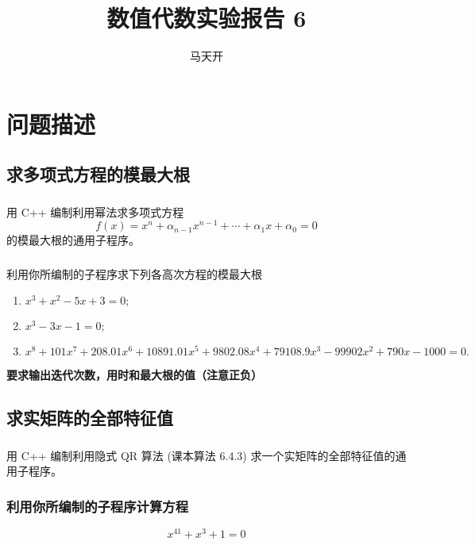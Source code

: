 \documentclass{article}
\title{数值代数实验报告 6}
\author{马天开}
\begin{document}
\maketitle

\section{问题描述}

\subsection{求多项式方程的模最大根}

\subsubsection{}用 C++ 编制利用幂法求多项式方程
\[
    f(x) = x^n + \alpha_{n-1}x^{n-1} +\cdots+ \alpha_1 x + \alpha_0 = 0
\] 的模最大根的通用子程序。

\subsubsection{}利用你所编制的子程序求下列各高次方程的模最大根

\begin{enumerate}
    \item $x^3 + x^2 - 5x + 3 = 0;$
    \item $x^3 - 3x - 1 = 0;$
    \item $x^8 + 101x^7 + 208.01x^6 + 10891.01x^5 + 9802.08x^4 + 79108.9x^3-99902x^2 + 790x-1000 = 0.$
\end{enumerate}

\textbf{要求输出迭代次数，用时和最大根的值（注意正负）}


\subsection{求实矩阵的全部特征值}

\subsubsection{}用 C++ 编制利用隐式 QR 算法 (课本算法 6.4.3) 求一个实矩阵的全部特征值的通用子程序。

\subsubsection{利用你所编制的子程序计算方程}
$$x^{41} + x^3 + 1 = 0 $$
\end{document}
